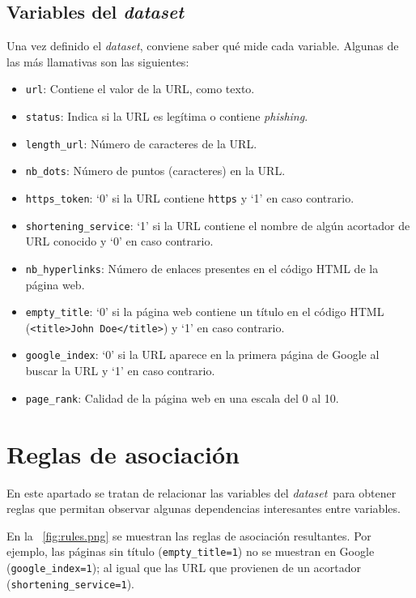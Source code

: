 \documentclass[12pt, a4paper]{article}
\renewcommand{\textit}{\textsl}
\newcommand*{\figref}[1]{\figurename~\ref{fig:#1}}
\newcommand*{\dataset}{\textit{dataset}}
\newcommand*{\phishing}{\textit{phishing}}
\begin{document}
    \subsection{Variables del \dataset}

      Una vez definido el \dataset, conviene saber qué mide cada variable. Algunas de las más llamativas son las siguientes:

      \begin{itemize}
        \item \texttt{url}: Contiene el valor de la URL, como texto.
        \item \texttt{status}: Indica si la URL es legítima o contiene \phishing.
        \item \texttt{length\_url}: Número de caracteres de la URL.
        \item \texttt{nb\_dots}: Número de puntos (caracteres) en la URL.
        \item \texttt{https\_token}: `0' si la URL contiene \texttt{https} y `1' en caso contrario.
        \item \texttt{shortening\_service}: `1' si la URL contiene el nombre de algún acortador de URL conocido y `0' en caso contrario.
        \item \texttt{nb\_hyperlinks}: Número de enlaces presentes en el código HTML de la página web.
        \item \texttt{empty\_title}: `0' si la página web contiene un título en el código HTML (\texttt{<title>John Doe</title>}) y `1' en caso contrario.
        \item \texttt{google\_index}: `0' si la URL aparece en la primera página de Google al buscar la URL y `1' en caso contrario.
        \item \texttt{page\_rank}: Calidad de la página web en una escala del 0 al 10.
      \end{itemize}

  \section{Reglas de asociación}

    En este apartado se tratan de relacionar las variables del \dataset\ para obtener reglas que permitan observar algunas dependencias interesantes entre variables.

    En la \figref{rules.png} se muestran las reglas de asociación resultantes. Por ejemplo, las páginas sin título (\texttt{empty\_title=1}) no se muestran en Google (\texttt{google\_index=1}); al igual que las URL que provienen de un acortador (\texttt{shortening\_service=1}).
\end{document}
